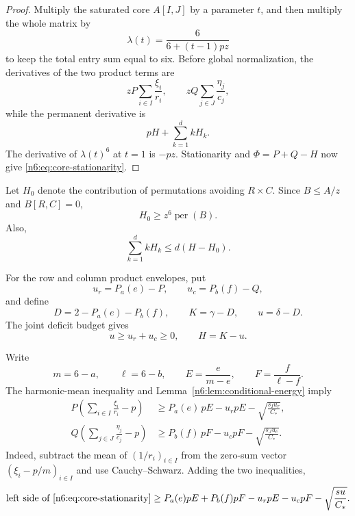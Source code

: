 \documentclass[11pt]{article}
\numberwithin{equation}{section}
\theoremstyle{definition}
\newcommand{\per}{\operatorname{per}}
\begin{document}
\begin{proof}
Multiply the saturated core $A[I,J]$ by a parameter $t$, and then multiply the
whole matrix by
\[
 \lambda(t)=\frac6{6+(t-1)pz}
\]
to keep the total entry sum equal to six.  Before global normalization, the
derivatives of the two product terms are
\[
 zP\sum_{i\in I}\frac{\xi_i}{r_i},
 \qquad
 zQ\sum_{j\in J}\frac{\eta_j}{c_j},
\]
while the permanent derivative is
\[
 pH+\sum_{k=1}^{d}kH_k.
\]
The derivative of $\lambda(t)^6$ at $t=1$ is $-pz$.  Stationarity and
$\Phi=P+Q-H$ now give \eqref{n6:eq:core-stationarity}.
\end{proof}

Let $H_0$ denote the contribution of permutations avoiding $R\times C$.
Since $B\le A/z$ and $B[R,C]=0$,
\begin{equation}
 H_0\ge z^6\per(B).\label{n6:eq:H0-B}
\end{equation}
Also,
\begin{equation}
 \sum_{k=1}^{d}kH_k\le d(H-H_0).\label{n6:eq:Hk-bound}
\end{equation}

For the row and column product envelopes, put
\begin{equation}
 u_r=P_a(e)-P,
 \qquad
 u_c=P_b(f)-Q,\label{n6:eq:uruc}
\end{equation}
and define
\begin{equation}
 D=2-P_a(e)-P_b(f),
 \qquad
 K=\gamma-D,
 \qquad
 u=\delta-D.\label{n6:eq:DKu}
\end{equation}
The joint deficit budget gives
\begin{equation}
 u\ge u_r+u_c\ge0,
 \qquad
 H=K-u.\label{n6:eq:u-budget}
\end{equation}

Write
\[
 m=6-a,
 \qquad \ell=6-b,
 \qquad
 E=\frac e{m-e},
 \qquad
 F=\frac f{\ell-f}.
\]
The harmonic-mean inequality and Lemma~\ref{n6:lem:conditional-energy} imply
\begin{align}
 P\left(\sum_{i\in I}\frac{\xi_i}{r_i}-p\right)
 &\ge
 P_a(e)\,pE-u_rpE-\sqrt{\frac{s_Iu_r}{C_*}},\label{n6:eq:row-core-lower}\\
 Q\left(\sum_{j\in J}\frac{\eta_j}{c_j}-p\right)
 &\ge
 P_b(f)\,pF-u_cpF-\sqrt{\frac{s_Ju_c}{C_*}}.\label{n6:eq:column-core-lower}
\end{align}
Indeed, subtract the mean of $(1/r_i)_{i\in I}$ from the zero-sum vector
$(\xi_i-p/m)_{i\in I}$ and use Cauchy--Schwarz.  Adding the two inequalities,
\begin{equation}
 \text{left side of \eqref{n6:eq:core-stationarity}}
 \ge
 P_a(e)pE+P_b(f)pF-u_rpE-u_cpF
 -\sqrt{\frac{su}{C_*}}.\label{n6:eq:core-lower-combined}
\end{equation}
\end{document}
